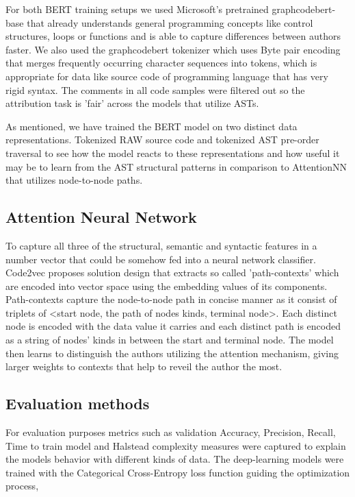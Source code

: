 \documentclass{article}
\begin{document}
For both BERT training setups we used Microsoft's pretrained graphcodebert-base \cite{codebert} that already understands general programming concepts like 
control structures, loops or functions and is able to capture differences between authors faster. We also used the graphcodebert tokenizer which uses 
Byte pair encoding that merges frequently occurring character sequences into tokens, which is appropriate for data like source code of programming language
that has very rigid syntax. The comments in all code samples were filtered out so the attribution task
is 'fair' across the models that utilize ASTs.

As mentioned, we have trained the BERT model on two distinct data representations. Tokenized RAW source code and tokenized AST pre-order traversal
to see how the model reacts to these representations and how useful it may be to learn from the AST structural patterns in comparison to AttentionNN 
that utilizes node-to-node paths.

\subsection{Attention Neural Network}

To capture all three of the structural, semantic and syntactic features in a number vector that could be somehow fed into a neural network classifier. 
Code2vec \cite{code2vec} proposes solution design that extracts so called 'path-contexts' which are encoded into vector space using the embedding values 
of its components.
Path-contexts capture the node-to-node path in concise manner as it consist of triplets of <start node, the path of nodes kinds, terminal node>.
Each distinct node is encoded with the data value it carries and each distinct path is encoded as a string of nodes' kinds in between the start and terminal node.
The model then learns to distinguish the authors utilizing the attention mechanism, giving larger weights to contexts that help to reveil the author the most.

\subsection{Evaluation methods}
For evaluation purposes metrics such as validation Accuracy, Precision, Recall, Time to train model and Halstead complexity measures were captured to explain the models
behavior with different kinds of data. The deep-learning models were trained with the Categorical Cross-Entropy loss function guiding the optimization process,
\end{document}
